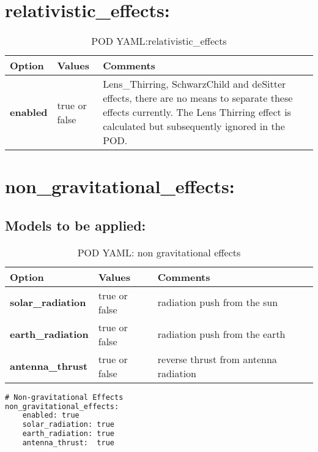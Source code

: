 \section{relativistic\_effects:}
\begin{table}[h!]
	\begin{tabular}{|p{4.5cm}|p{2cm}|p{3.5cm}|}
		\hline
		Option & Values & Comments \\
		\hline
		\textbf{enabled} & true or false & Lens\_Thirring, SchwarzChild and deSitter effects, there are no means to separate these effects currently. The Lens Thirring effect is calculated but subsequently ignored in the POD.\\
		\hline
	\end{tabular}
	\caption{POD YAML:relativistic\_effects}
	\label{table:pod_yaml_relativistic_effects}
\end{table}
%
\section{non\_gravitational\_effects:}
\subsection{Models to be applied:}
\begin{table}[h!]
	\begin{tabular}{|p{4.5cm}|p{2cm}|p{3.5cm}|}
		\hline
		Option & Values & Comments \\
		\hline
		\textbf{solar\_radiation} & true or false & radiation push from the sun \\
		\textbf{earth\_radiation} & true or false & radiation push from the earth \\
		\textbf{antenna\_thrust}  & true or false & reverse thrust from antenna radiation \\
		\hline
	\end{tabular}
	\caption{POD YAML: non gravitational effects}
	\label{table:pod_yaml_non_grav}
\end{table}
%
\begin{lstlisting}[language=xml,caption=yaml example for non gravitational effects]
# Non-gravitational Effects
non_gravitational_effects:
	enabled: true
	solar_radiation: true
	earth_radiation: true
	antenna_thrust:  true
\end{lstlisting}

